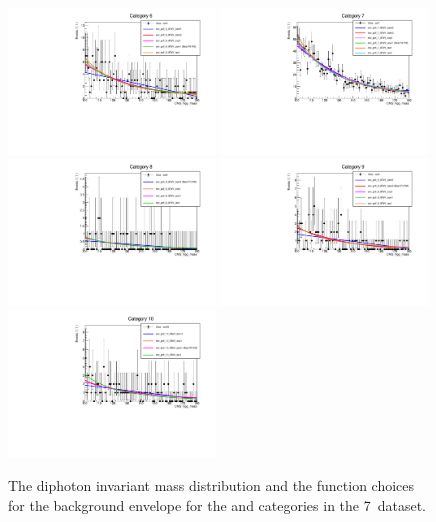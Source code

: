 \begin{figure}
  \includegraphics[width=0.49\textwidth]{ch5_anal_and_results/plots/mva_8TeV/multipdf_cat6.pdf}
  \includegraphics[width=0.49\textwidth]{ch5_anal_and_results/plots/mva_8TeV/multipdf_cat7.pdf}\\
  \includegraphics[width=0.49\textwidth]{ch5_anal_and_results/plots/mva_8TeV/multipdf_cat8.pdf}
  \includegraphics[width=0.49\textwidth]{ch5_anal_and_results/plots/mva_8TeV/multipdf_cat9.pdf}\\
  \includegraphics[width=0.49\textwidth]{ch5_anal_and_results/plots/mva_8TeV/multipdf_cat10.pdf}
  \caption{The diphoton invariant mass distribution and the function choices for the background envelope for the \VH and \ttH categories in the 7~\TeV dataset. }
  \label{fig:multipdf3}
\end{figure}

